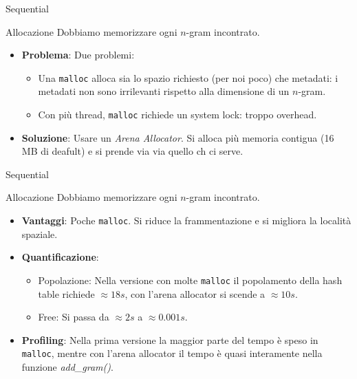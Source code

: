 \begin{frame}{Sequential}
    \begin{block}{Allocazione}
        Dobbiamo memorizzare ogni $n$-gram incontrato.
        \begin{itemize}
            \item \textbf{Problema}: Due problemi:
            \begin{itemize}
                \item Una \texttt{malloc} alloca sia lo spazio richiesto (per noi poco) che metadati: i metadati non sono irrilevanti rispetto alla dimensione di un $n$-gram.
                \item Con più thread, \texttt{malloc} richiede un system lock: troppo overhead.
            \end{itemize}
            \item \textbf{Soluzione}: Usare un \textit{Arena Allocator}. Si alloca più memoria contigua (16 MB di deafult) e si prende via via quello ch ci serve.
        \end{itemize}
    \end{block}
\end{frame}

\begin{frame}{Sequential}
    \begin{block}{Allocazione}
        Dobbiamo memorizzare ogni $n$-gram incontrato.
        \begin{itemize}
            \item \textbf{Vantaggi}: Poche \texttt{malloc}. Si riduce la frammentazione e si migliora la località spaziale.
            \item \textbf{Quantificazione}:
            \begin{itemize}
                \item Popolazione: Nella versione con molte \texttt{malloc} il popolamento della hash table richiede $\approx 18s$, con l'arena allocator si scende a $\approx 10s$.
                \item Free: Si passa da $\approx 2s$ a $\approx 0.001s$.
            \end{itemize}
            \item \textbf{Profiling}: Nella prima versione la maggior parte del tempo è speso in \texttt{malloc}, mentre con l'arena allocator il tempo è quasi interamente nella funzione \textit{add\_gram()}.
        \end{itemize}
    \end{block}
\end{frame}

